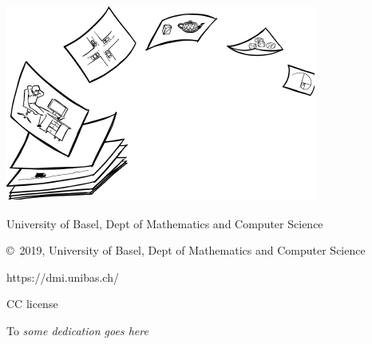 \documentclass{tilics}
\begin{document}
  \pagecolor{UnibasMint}
  \hfill\includegraphics{figs/start-notext-scaled.pdf}


  \vskip 4mm


  \newpage\pagecolor{white}\rightBar\vspace*{\fill}
  \noindent
  {\small University of Basel, Dept of Mathematics and Computer Science}

  \newpage
  \voffset 0.4in%

  \leftBar\vspace*{\fill}
  \vskip 1mm

  \newpage\rightBar\vspace*{\fill}
  {\small\raggedright
    \noindent
    \copyright\ 2019, University of Basel, Dept of Mathematics and Computer Science

    \noindent
    https://dmi.unibas.ch/

    \noindent
    CC license
  }

  \newpage\leftBar\vspace*{\fill}
  \noindent\hfill{\small To {\em some dedication goes here}}\hfill
  \vspace*{\fill}
  
\end{document}
